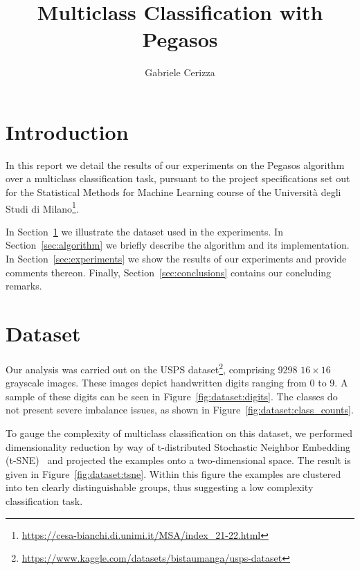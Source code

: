 \documentclass[runningheads]{llncs}
\begin{document}
\title{
    Multiclass Classification with Pegasos
}
\author{Gabriele Cerizza}


\maketitle

\section*{Introduction}
\label{sec:introduction}

In this report we detail the results of our experiments on the Pegasos algorithm~\cite{shalev-pegasos-2011} over a multiclass classification task, pursuant to the project specifications set out for the Statistical Methods for Machine Learning course of the Università degli Studi di Milano\footnote{\url{https://cesa-bianchi.di.unimi.it/MSA/index\_21-22.html}}. 

In Section~\ref{sec:dataset} we illustrate the dataset used in the experiments. In Section~\ref{sec:algorithm} we briefly describe the algorithm and its implementation. In Section~\ref{sec:experiments} we show the results of our experiments and provide comments thereon. Finally, Section~\ref{sec:conclusions} contains our concluding remarks. 

\section{Dataset}
\label{sec:dataset}

Our analysis was carried out on the USPS dataset\footnote{\url{https://www.kaggle.com/datasets/bistaumanga/usps-dataset}}, comprising 9298 $16 \times 16$ grayscale images. These images depict handwritten digits ranging from 0 to 9. A sample of these digits can be seen in Figure~\ref{fig:dataset:digits}. The classes do not present severe imbalance issues, as shown in Figure~\ref{fig:dataset:class_counts}.

To gauge the complexity of multiclass classification on this dataset, we performed dimensionality reduction by way of  t-distributed Stochastic Neighbor Embedding (t-SNE)~\cite{maaten-2008-tsne} and projected the examples onto a two-dimensional space. The result is given in Figure~\ref{fig:dataset:tsne}. Within this figure the examples are clustered into ten clearly distinguishable groups, thus suggesting a low complexity classification task.   
\end{document}

